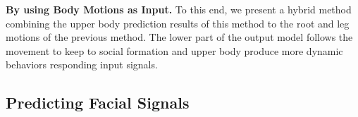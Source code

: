 \textbf{By using Body Motions as Input.} To this end, we present a hybrid method combining the upper body prediction results of this method to the root and leg motions of the previous method. The lower part of the output model follows the movement to keep to social formation and upper body produce more dynamic behaviors responding input signals.

\subsection{Predicting Facial Signals}


